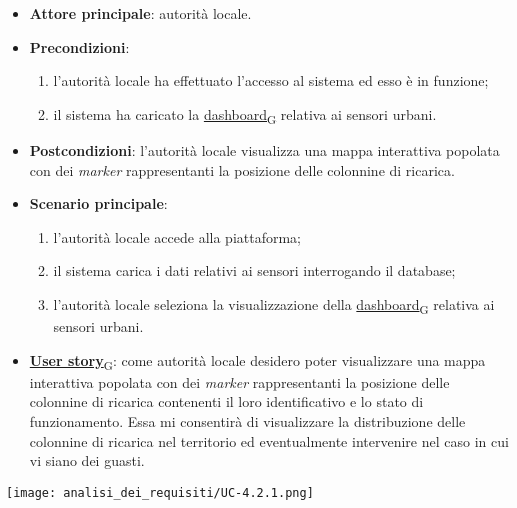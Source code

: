 \newpage
{}
\begin{itemize}
	\item \textbf{Attore principale}: autorità locale.
	\item \textbf{Precondizioni}:
	      \begin{enumerate}
		      \item l'autorità locale ha effettuato l'accesso al sistema ed esso è in funzione;
		      \item il sistema ha caricato la \href{https://7last.github.io/docs/pb/documentazione-interna/glossario\#dashboard}{dashboard\textsubscript{G}} relativa ai sensori urbani.
	      \end{enumerate}
	\item \textbf{Postcondizioni}: l'autorità locale visualizza una mappa interattiva popolata con dei \textit{marker} rappresentanti la posizione delle colonnine di ricarica.
	\item \textbf{Scenario principale}:
	      \begin{enumerate}
		      \item l'autorità locale accede alla piattaforma;
		      \item il sistema carica i dati relativi ai sensori interrogando il database;
		      \item l'autorità locale seleziona la visualizzazione della \href{https://7last.github.io/docs/pb/documentazione-interna/glossario\#dashboard}{dashboard\textsubscript{G}} relativa ai sensori urbani.
	      \end{enumerate}
	\item \href{https://7last.github.io/docs/pb/documentazione-interna/glossario\#user-story}{\textbf{User story}\textsubscript{G}}:
	      come autorità locale desidero poter visualizzare una mappa interattiva popolata con dei \textit{marker} rappresentanti la posizione delle colonnine di ricarica
	      contenenti il loro identificativo e lo stato di funzionamento. Essa mi consentirà di visualizzare la distribuzione delle colonnine di ricarica nel territorio
	      ed eventualmente intervenire nel caso in cui vi siano dei guasti.
\end{itemize}
\begin{center}
	\texttt{[image: analisi\_dei\_requisiti/UC-4.2.1.png]}
\end{center}

